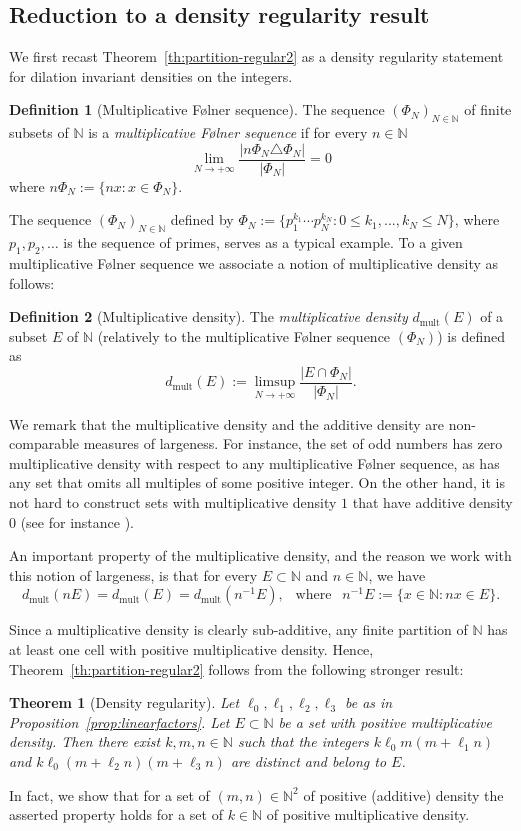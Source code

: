 \documentclass[11pt]{amsart}
\newtheorem{theorem}[lemma]{Theorem}
\theoremstyle{definition}
\newtheorem*{definition}{Definition}
\begin{document}
\subsection{Reduction to a density regularity result}\label{SS:dildens}
We first recast Theorem~\ref{th:partition-regular2} as a density regularity
statement for dilation invariant densities on the integers.
\begin{definition}[Multiplicative F\o lner sequence]
  The sequence $(\Phi_N)_{N\in{{\mathbb N}}}$ of finite subsets of ${{\mathbb N}}$  is a
\emph{multiplicative F\o lner sequence} if  for every $n\in{{\mathbb N}}$
$$
\lim_{N\to+\infty} \frac{|n\Phi_N \triangle  \Phi_N|}{|\Phi_N|}=0
$$
where
$n\Phi_N:=\{nx\colon x\in\Phi_N\}$.
\end{definition}
The sequence $(\Phi_N)_{N\in{{\mathbb N}}}$ defined by $
\Phi_N:=\{p_1^{k_1}\cdots p_N^{k_N}\colon 0\leq k_1,\ldots, k_N\leq
N\}$,
 where $p_1,p_2,\ldots$ is the sequence of primes, serves as a
 typical example.
To a given  multiplicative F\o lner sequence we
associate a notion of multiplicative density as follows:
\begin{definition}[Multiplicative density]\label{def:multdensity}
The \emph{multiplicative density} ${d_\textrm{mult}}(E)$ of a subset $E$ of
${{\mathbb N}}$ (relatively to the multiplicative  F\o lner sequence
$(\Phi_N)$) is defined as
$$ {d_\textrm{mult}}(E):= \limsup_{N\to+\infty}
\frac{|E\cap\Phi_N|}{|\Phi_N|} .
$$
\end{definition}
We remark that the multiplicative density and the additive
density are non-comparable measures of largeness.
For
instance,   the set of odd numbers has zero multiplicative density with respect to any multiplicative  F\o lner sequence,
as has any set that omits all multiples of some positive
integer. On the other hand, it is not hard to construct sets with
multiplicative density $1$ that have additive density $0$ (see for
instance \cite{Be05}).

An important property of the multiplicative density, and the reason
we work with this notion of largeness,  is that for every $E\subset
{{\mathbb N}}$ and $n\in{{\mathbb N}}$, we have
$$
{d_\textrm{mult}}(nE)={d_\textrm{mult}}(E)={d_\textrm{mult}}(n{^{-1}} E), \ \ \text{ where }\ \  n{^{-1}}
E:=\{x\in{{\mathbb N}}\colon nx\in E\}.
$$

Since a  multiplicative density is clearly sub-additive,
any finite partition of ${{\mathbb N}}$ has at least one cell with positive
multiplicative density. Hence,  Theorem~\ref{th:partition-regular2} follows
from the following stronger result:
\begin{theorem}[Density regularity]
\label{th:density-regular}
 Let $\ell_0,
\ell_1,\ell_2,\ell_3$ be as in Proposition~\ref{prop:linearfactors}.
Let  $E\subset{{\mathbb N}}$ be a set with  positive multiplicative density.
Then there exist $k,m,n\in{{\mathbb N}}$ such that the integers $k\ell_0 m(m+\ell_1n)$ and
$k\ell_0 (m+\ell_2n)(m+\ell_3n)$ are distinct and belong to $E$.
\end{theorem}
In fact, we show that for a set of $(m,n)\in{{\mathbb N}}^2$ of positive
(additive) density the asserted property holds for a set of $k\in
{{\mathbb N}}$ of positive multiplicative density.
\end{document}
